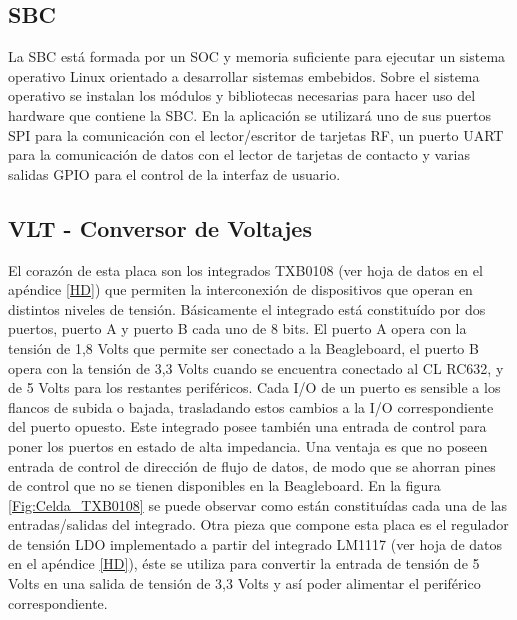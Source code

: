 \subsection{SBC}
La SBC está formada por un SOC y memoria suficiente para ejecutar un sistema operativo Linux orientado a desarrollar sistemas embebidos. Sobre el sistema operativo se instalan los módulos y bibliotecas necesarias para hacer uso del hardware que contiene la SBC. En la aplicación se utilizará uno de sus puertos SPI para la comunicación con el lector/escritor de tarjetas RF, un puerto UART para la comunicación de datos con el lector de tarjetas de contacto y varias salidas GPIO para el control de la interfaz de usuario.

\subsection{VLT - Conversor de Voltajes}
El corazón de esta placa son los integrados TXB0108 \cite{HD_VLT} (ver hoja de datos en el apéndice \ref{HD}) que permiten la interconexión de dispositivos que operan en distintos niveles de tensión. Básicamente el integrado está constituído por dos puertos, puerto A y puerto B cada uno de 8 bits. El puerto A opera con la tensión de 1,8 Volts que permite ser conectado a la Beagleboard, el puerto B opera con la tensión de 3,3 Volts cuando se encuentra conectado al CL RC632, y de 5 Volts para los restantes periféricos.
Cada I/O de un puerto es sensible a los flancos de subida o bajada, trasladando estos cambios a la I/O correspondiente del puerto opuesto. 
Este integrado posee también una entrada de control para poner los puertos en estado de alta impedancia.
Una ventaja es que no poseen entrada de control de dirección de flujo de datos, de modo que se ahorran pines de control que no se tienen disponibles en la Beagleboard.
En la figura \ref{Fig:Celda_TXB0108} se puede observar como están constituídas cada una de las entradas/salidas del integrado.
Otra pieza que compone esta placa es el regulador de tensión LDO implementado a partir del integrado LM1117 \cite{LDO} (ver hoja de datos en el apéndice \ref{HD}), éste se utiliza para convertir la entrada de tensión de 5 Volts en una salida de tensión de 3,3 Volts y así poder alimentar el periférico correspondiente.


